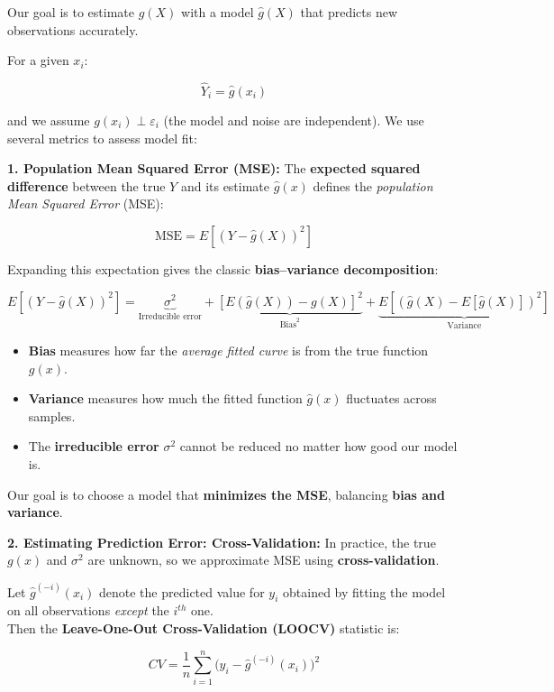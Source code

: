 \documentclass[
  letterpaper,
  DIV=11,
  numbers=noendperiod]{scrreprt}
\providecommand{\tightlist}{%
  \setlength{\itemsep}{0pt}\setlength{\parskip}{0pt}}\usepackage{longtable,booktabs,array}
\begin{document}
Our goal is to estimate \(g(X)\) with a model \(\hat{g}(X)\) that
predicts new observations accurately.

For a given \(x_i\):

\[
\hat{Y}_i = \hat{g}(x_i)
\]

and we assume \(g(x_i) \perp \varepsilon_i\) (the model and noise are
independent). We use several metrics to assess model fit:

\textbf{1. Population Mean Squared Error (MSE):} The \textbf{expected
squared difference} between the true \(Y\) and its estimate
\(\hat{g}(x)\) defines the \emph{population Mean Squared Error} (MSE):

\[
\text{MSE} = E[(Y - \hat{g}(X))^2]
\]

Expanding this expectation gives the classic \textbf{bias--variance
decomposition}:

\[
E[(Y - \hat{g}(X))^2] =
\underbrace{\sigma^2}_{\text{Irreducible error}}
+ \underbrace{[E(\hat{g}(X)) - g(X)]^2}_{\text{Bias}^2}
+ \underbrace{E[(\hat{g}(X) - E[\hat{g}(X)])^2]}_{\text{Variance}}
\]

\begin{itemize}
\tightlist
\item
  \textbf{Bias} measures how far the \emph{average fitted curve} is from
  the true function \(g(x)\).\\
\item
  \textbf{Variance} measures how much the fitted function \(\hat{g}(x)\)
  fluctuates across samples.\\
\item
  The \textbf{irreducible error} \(\sigma^2\) cannot be reduced no
  matter how good our model is.
\end{itemize}

Our goal is to choose a model that \textbf{minimizes the MSE}, balancing
\textbf{bias and variance}.

\textbf{2. Estimating Prediction Error: Cross-Validation:} In practice,
the true \(g(x)\) and \(\sigma^2\) are unknown, so we approximate MSE
using \textbf{cross-validation}.

Let \(\hat{g}^{(-i)}(x_i)\) denote the predicted value for \(y_i\)
obtained by fitting the model on all observations \emph{except} the
\(i^{th}\) one.\\
Then the \textbf{Leave-One-Out Cross-Validation (LOOCV)} statistic is:

\[
CV = \frac{1}{n} \sum_{i=1}^{n} \big(y_i - \hat{g}^{(-i)}(x_i)\big)^2
\]
\end{document}
